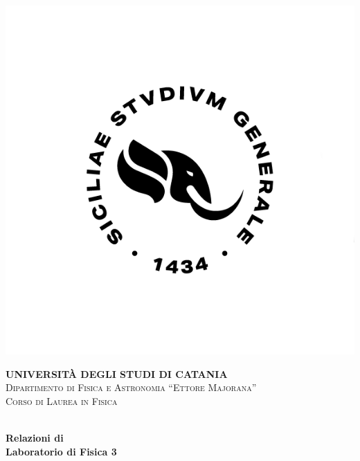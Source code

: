 \begin{titlingpage}
    \begin{center}
        \begin{minipage}[h!]{\linewidth}
            \begin{minipage}[ht!]{\linewidth}
                \centering
                \includegraphics[width=\unictsize]{images/title/UniCT-Logo-Nero-quadrato.png}
            \end{minipage}
            \centering\large
            \textbf{UNIVERSITÀ DEGLI STUDI DI CATANIA}
            \\[5pt]
            \normalsize
            \textsc{Dipartimento di Fisica e Astronomia ``Ettore Majorana''}
            \\[5pt]
            \textsc{Corso di Laurea in Fisica}
            \\[10pt]
            \doublerule
        \end{minipage}
        \\[50pt]
        \vspace{\fill}
        {\huge\bfseries Relazioni di\\Laboratorio di Fisica 3\\}

\end{center}
\end{titlingpage}
